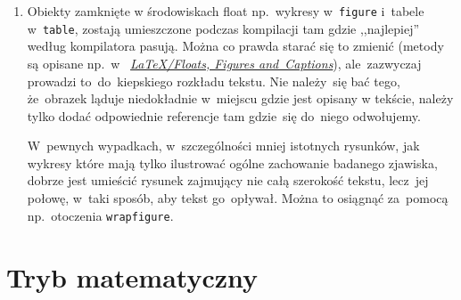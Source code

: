 \documentclass[a4paper,11pt]{article}
\begin{document}
\begin{enumerate}
  Jeśli teraz \LaTeX{} stwierdzi, że~jest błąd w~jakimś miejscu
  tekstu, a~ty nie możesz znaleźć miejsca gdzie on~dokładnie jest
  (wskazania kompilatora~są często bardzo mało dokładne), proponujemy
  postępować w~następujący sposób. Zakomentuj możliwie mały blok
  tekstu wokół miejsca w~którym wskazany jest błąd, tak by~plik
  zaczął~się ponownie kompilować. Następnie odkomentowuj ten tekst
  porcjami do~momentu, aż~błąd pojawi~się znowu. Teraz już wiesz,
  że~musi być w~ostatnim odkomentowany fragmencie.

  Jeśli w~tym fragmencie dalej nie jesteś w~stanie go znaleźć, spróbuj
  powtórzyć opisaną wyżej procedurę na~nim. I~tak do momentu, aż~go
  znajdziesz. Życzymy powodzenia~\smiley.

\item Obiekty zamknięte w środowiskach float np.~wykresy
  w~\texttt{figure} i~tabele w~\texttt{table}, zostają umieszczone
  podczas kompilacji tam gdzie ,,najlepiej'' według kompilatora
  pasują. Można co prawda starać się to zmienić (metody są opisane
  np.~w~
  \href{https://en.wikibooks.org/wiki/LaTeX/Floats,\_Figures\_and\_Captions}{\emph{\LaTeX/Floats,
      Figures and~Captions}}), ale~zazwyczaj prowadzi to~do~kiepskiego
  rozkładu tekstu. Nie należy~się bać tego, że~obrazek ląduje
  niedokładnie w~miejscu gdzie jest opisany w tekście, należy tylko
  dodać odpowiednie referencje tam gdzie~się do~niego odwołujemy.

  W~pewnych wypadkach, w~szczególności mniej istotnych rysunków, jak
  wykresy które mają tylko ilustrować ogólne zachowanie badanego
  zjawiska, dobrze jest umieścić rysunek zajmujący nie całą szerokość
  tekstu, lecz~jej połowę, w~taki sposób, aby tekst go~opływał. Można to osiągnąć za~pomocą np.~otoczenia \texttt{wrapfigure}.
\end{enumerate}





\section{Tryb matematyczny}
\label{sec:trybmatematyczny}
\end{document}
